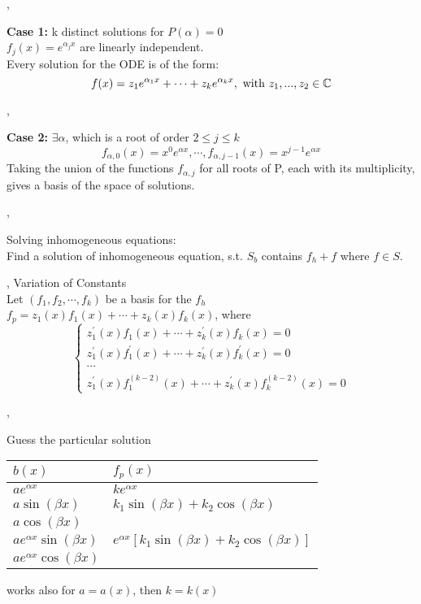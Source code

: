 \sep

\textbf{Case 1:} k distinct solutions for $P(\alpha) = 0$ \\
$f_j(x) = e^{\alpha_j x}$ are linearly independent. \\

Every solution for the ODE is of the form:
\[ f(x) = z_1 e^{\alpha_1 x} + \cdots + z_k e^{\alpha_k x}, \text{ with }  z_1, ..., z_2 \in \mathbb{C}\]

\sep

\textbf{Case 2:} $\exists \alpha$, which is a root of order $2 \leq j \leq k$
\[ f_{\alpha, 0}(x) = x^0 e^{\alpha x}, \cdots, f_{\alpha, j - 1}(x) = x^{j - 1}  e^{\alpha x}\]
Taking the union of the functions $f_{\alpha, j}$ for all roots of P, each with its multiplicity, gives a basis of the space of solutions. 

\sep

\Procedure Solving inhomogeneous equations: \\
Find a solution of inhomogeneous equation, s.t. $S_b$ contains $f_h + f$ where $f \in S$.

\sep
\Procedure Variation of Constants \\
Let $(f_1, f_2, \cdots , f_k)$ be a basis for the $f_h$ \\
$f_p = z_1(x) f_1(x) + \cdots + z_k(x) f_k(x)$, where
\[
\left\{\begin{array}{l}
z_{1}^{\prime}(x) f_{1}(x)+\cdots+z_{k}^{\prime}(x) f_{k}(x)=0 \\
z_{1}^{\prime}(x) f_{1}^{\prime}(x)+\cdots+z_{k}^{\prime}(x) f_{k}^{\prime}(x)=0 \\
\cdots \\
z_{1}^{\prime}(x) f_{1}^{(k-2)}(x)+\cdots+z_{k}^{\prime}(x) f_{k}^{(k-2)}(x)=0
\end{array}\right.
\]

\sep

\Trick Guess the particular solution

\begin{tabular}{ |p{1.8cm}||p{3.85cm}|  }
\hline
$b(x)$ & $f_p(x)$\\
\hline\hline
$a e^{\alpha x}$ & $k e^{\alpha x}$ \\
\hline
$a\sin(\beta x)$ & $k_1  \sin(\beta x) + k_2 \cos(\beta x)$ \\
$a\cos(\beta x)$ & \\
\hline
$a e^{\alpha x} \sin(\beta x)$ & $ e^{\alpha x}  [ k_1 \sin(\beta x) + k_2 \cos(\beta x)]$ \\
$a e^{\alpha x} \cos(\beta x)$ & \\
\hline
\end{tabular}
\Bem works also for $a = a(x)$, then $k = k(x)$